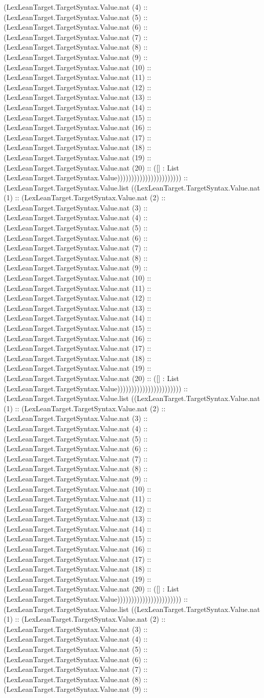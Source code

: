 \documentclass[11pt]{article}
\begin{document}
(LexLeanTarget.TargetSyntax.Value.nat (4) :: (LexLeanTarget.TargetSyntax.Value.nat (5) :: (LexLeanTarget.TargetSyntax.Value.nat (6) :: (LexLeanTarget.TargetSyntax.Value.nat (7) :: (LexLeanTarget.TargetSyntax.Value.nat (8) :: (LexLeanTarget.TargetSyntax.Value.nat (9) :: (LexLeanTarget.TargetSyntax.Value.nat (10) :: (LexLeanTarget.TargetSyntax.Value.nat (11) :: (LexLeanTarget.TargetSyntax.Value.nat (12) :: (LexLeanTarget.TargetSyntax.Value.nat (13) :: (LexLeanTarget.TargetSyntax.Value.nat (14) :: (LexLeanTarget.TargetSyntax.Value.nat (15) :: (LexLeanTarget.TargetSyntax.Value.nat (16) :: (LexLeanTarget.TargetSyntax.Value.nat (17) :: (LexLeanTarget.TargetSyntax.Value.nat (18) :: (LexLeanTarget.TargetSyntax.Value.nat (19) :: (LexLeanTarget.TargetSyntax.Value.nat (20) :: ([] : List (LexLeanTarget.TargetSyntax.Value))))))))))))))))))))))) :: (LexLeanTarget.TargetSyntax.Value.list ((LexLeanTarget.TargetSyntax.Value.nat (1) :: (LexLeanTarget.TargetSyntax.Value.nat (2) :: (LexLeanTarget.TargetSyntax.Value.nat (3) :: (LexLeanTarget.TargetSyntax.Value.nat (4) :: (LexLeanTarget.TargetSyntax.Value.nat (5) :: (LexLeanTarget.TargetSyntax.Value.nat (6) :: (LexLeanTarget.TargetSyntax.Value.nat (7) :: (LexLeanTarget.TargetSyntax.Value.nat (8) :: (LexLeanTarget.TargetSyntax.Value.nat (9) :: (LexLeanTarget.TargetSyntax.Value.nat (10) :: (LexLeanTarget.TargetSyntax.Value.nat (11) :: (LexLeanTarget.TargetSyntax.Value.nat (12) :: (LexLeanTarget.TargetSyntax.Value.nat (13) :: (LexLeanTarget.TargetSyntax.Value.nat (14) :: (LexLeanTarget.TargetSyntax.Value.nat (15) :: (LexLeanTarget.TargetSyntax.Value.nat (16) :: (LexLeanTarget.TargetSyntax.Value.nat (17) :: (LexLeanTarget.TargetSyntax.Value.nat (18) :: (LexLeanTarget.TargetSyntax.Value.nat (19) :: (LexLeanTarget.TargetSyntax.Value.nat (20) :: ([] : List (LexLeanTarget.TargetSyntax.Value))))))))))))))))))))))) :: (LexLeanTarget.TargetSyntax.Value.list ((LexLeanTarget.TargetSyntax.Value.nat (1) :: (LexLeanTarget.TargetSyntax.Value.nat (2) :: (LexLeanTarget.TargetSyntax.Value.nat (3) :: (LexLeanTarget.TargetSyntax.Value.nat (4) :: (LexLeanTarget.TargetSyntax.Value.nat (5) :: (LexLeanTarget.TargetSyntax.Value.nat (6) :: (LexLeanTarget.TargetSyntax.Value.nat (7) :: (LexLeanTarget.TargetSyntax.Value.nat (8) :: (LexLeanTarget.TargetSyntax.Value.nat (9) :: (LexLeanTarget.TargetSyntax.Value.nat (10) :: (LexLeanTarget.TargetSyntax.Value.nat (11) :: (LexLeanTarget.TargetSyntax.Value.nat (12) :: (LexLeanTarget.TargetSyntax.Value.nat (13) :: (LexLeanTarget.TargetSyntax.Value.nat (14) :: (LexLeanTarget.TargetSyntax.Value.nat (15) :: (LexLeanTarget.TargetSyntax.Value.nat (16) :: (LexLeanTarget.TargetSyntax.Value.nat (17) :: (LexLeanTarget.TargetSyntax.Value.nat (18) :: (LexLeanTarget.TargetSyntax.Value.nat (19) :: (LexLeanTarget.TargetSyntax.Value.nat (20) :: ([] : List (LexLeanTarget.TargetSyntax.Value))))))))))))))))))))))) :: (LexLeanTarget.TargetSyntax.Value.list ((LexLeanTarget.TargetSyntax.Value.nat (1) :: (LexLeanTarget.TargetSyntax.Value.nat (2) :: (LexLeanTarget.TargetSyntax.Value.nat (3) :: (LexLeanTarget.TargetSyntax.Value.nat (4) :: (LexLeanTarget.TargetSyntax.Value.nat (5) :: (LexLeanTarget.TargetSyntax.Value.nat (6) :: (LexLeanTarget.TargetSyntax.Value.nat (7) :: (LexLeanTarget.TargetSyntax.Value.nat (8) :: (LexLeanTarget.TargetSyntax.Value.nat (9) :: 
\end{document}
